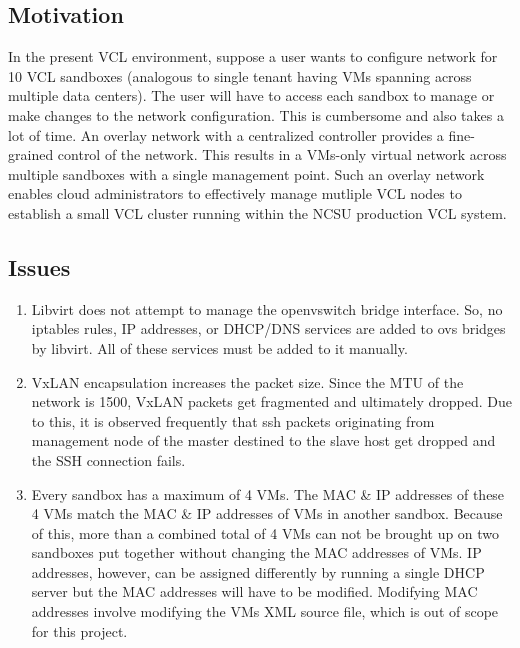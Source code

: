 \documentclass[12pt]{extarticle}
\begin{document}
\subsection{Motivation}

In the present VCL environment, suppose a user wants to configure network for 10 VCL sandboxes (analogous to single tenant having VMs spanning across multiple data centers). The user will have to access each sandbox to manage or make changes to the network configuration. This is cumbersome and also takes a lot of time. An overlay network with a centralized controller provides a fine-grained control of the network. This results in a VMs-only virtual network across multiple sandboxes with a single management point. Such an overlay network enables cloud administrators to effectively manage mutliple VCL nodes to establish a small VCL cluster running within the NCSU production VCL system. 

\subsection{Issues}
\begin{enumerate}
    \item Libvirt does not attempt to manage the openvswitch bridge interface. So, no iptables rules, IP addresses, or DHCP/DNS services are added to ovs bridges by libvirt. All of these services must be added to it manually. 
    \item VxLAN encapsulation increases the packet size. Since the MTU of the network is 1500, VxLAN packets get fragmented and ultimately dropped. Due to this, it is observed frequently that ssh packets originating from management node of the master destined to the slave host get dropped and the SSH connection fails.
    \item Every sandbox has a maximum of 4 VMs. The MAC \& IP addresses of these 4 VMs match the MAC \& IP addresses of VMs in another sandbox. Because of this, more than a combined total of 4 VMs can not be brought up on two sandboxes put together without changing the MAC addresses of VMs. IP addresses, however, can be assigned differently by running a single DHCP server but the MAC addresses will have to be modified. Modifying MAC addresses involve modifying the VMs XML source file, which is out of scope for this project.
\end{enumerate}

\end{document}
